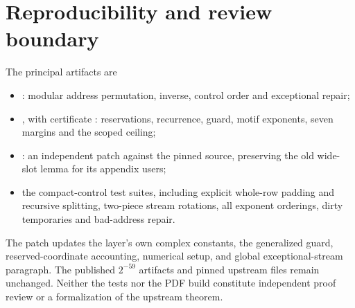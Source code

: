 \documentclass[11pt]{article}
\begin{document}
\section{Reproducibility and review boundary}
The principal artifacts are
\begin{itemize}
\item {}: modular address permutation,
inverse, control order and exceptional repair;
\item {}, with certificate
\newline{}: reservations, recurrence,
guard, motif exponents, seven margins and the scoped ceiling;
\item {}: an independent patch against
the pinned source, preserving the old wide-slot lemma for its appendix users;
\item the compact-control test suites, including explicit whole-row padding
and recursive splitting, two-piece stream rotations, all exponent orderings,
dirty temporaries and bad-address repair.
\end{itemize}
The patch updates the layer's own complex constants, the generalized guard,
reserved-coordinate accounting, numerical setup, and global exceptional-stream
paragraph. The published $2^{-59}$ artifacts and pinned upstream files remain
unchanged. Neither the tests nor the PDF build constitute independent proof
review or a formalization of the upstream theorem.
\end{document}
